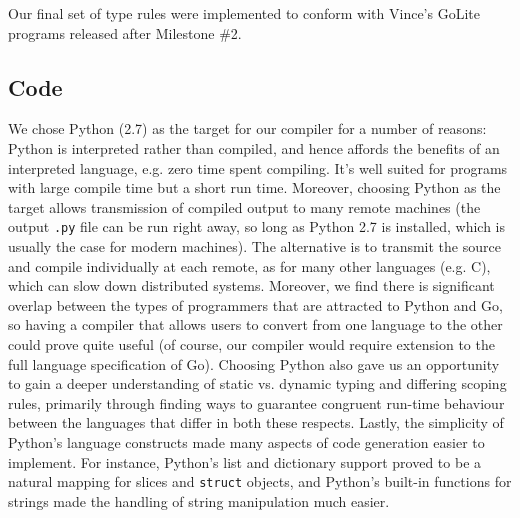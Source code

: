 \documentclass{article}
\begin{document}
Our final set of type rules were implemented to conform with Vince's GoLite programs released after Milestone \#2.

\subsection{Code}

We chose Python (2.7) as the target for our compiler for a number of reasons: Python is interpreted rather than compiled, and hence affords the benefits of an interpreted language, e.g. zero time spent compiling. It's well suited for programs with large compile time but a short run time. Moreover, choosing Python as the target allows transmission of compiled output to many remote machines (the output \texttt{.py} file can be run right away, so long as Python 2.7 is installed, which is usually the case for modern machines). The alternative is to transmit the source and compile individually at each remote, as  for many other languages (e.g. C), which can slow down distributed systems. Moreover, we find there is significant overlap between the types of programmers that are attracted to Python and Go, so having a compiler that allows users to convert from one language to the other could prove quite useful (of course, our compiler would require extension to the full language specification of Go). Choosing Python also gave us an opportunity to gain a deeper understanding of static vs. dynamic typing and differing scoping rules, primarily through finding ways to guarantee congruent run-time behaviour between the languages that differ in both these respects. Lastly, the simplicity of Python's language constructs made many aspects of code generation easier to implement. For instance, Python's list and dictionary support proved to be a natural mapping for slices and \texttt{struct} objects, and Python's built-in functions for strings made the handling of string manipulation much easier.
\end{document}
